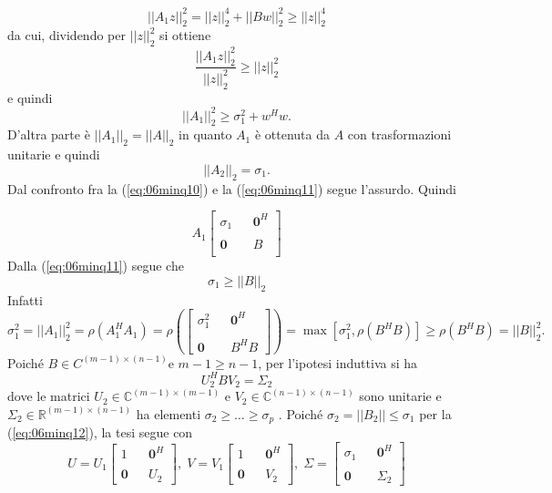 \begin{thproof}
$$
||A_1 z||_2^2 = ||z||_2^4 + || Bw||_2^{2} \geq ||z||_2^4
$$
da cui, dividendo per $||z||_2^2$ si ottiene
$$
\dfrac{||A_1z||_2^2}{||z||_2^2} \geq ||z||_2^2
$$
e quindi
\begin{equation}
  \label{eq:06minq10} ||A_1||_2^{2} \geq \sigma_1^{2} + w^{H}w.
\end{equation}
D'altra parte \`e $||A_1||_2 = ||A||_2$ 
 in quanto $A_1$ \`e ottenuta da $A$ con trasformazioni unitarie e
quindi
 \begin{equation}
   \label{eq:06minq11} ||A_2||_2 =\sigma_1.
 \end{equation} Dal confronto fra la (\ref{eq:06minq10}) e la
(\ref{eq:06minq11}) segue l’assurdo. Quindi

$$
A_1 \left[
\begin{array}{ccc} \sigma_1 & & \mathbf{0}^{H}\\ & & \\ \mathbf{0} & &
B \\
\end{array} \right]
$$
Dalla (\ref{eq:06minq11}) segue che
\begin{equation}
  \label{eq:06minq12} \sigma_1 \geq ||B||_2
\end{equation} Infatti
$$
\sigma_1^{2} = ||A_1||_2^{2} =  \rho(A_1^{H}A_1) = \rho \left( \left[
\begin{array}{ccc} \sigma_1^2 & & \mathbf{0}^{H}\\ & & \\ \mathbf{0} &
& B^{H}B
\end{array} \right] \right) = \max [\sigma_1^{2}, \rho(B^{H}B)] \geq
\rho (B^H B) = ||B||_2^2 .
$$
Poich\'e $B \in C^{(m−1)\times(n−1)} $e $m − 1 \geq n − 1$, per
l'ipotesi induttiva si ha
$$
U_2^{H}BV_2 = \Sigma_2
$$
dove le matrici $U_2 \in \mathbb{C}^{(m−1)\times(m−1)}$ e $V_2 \in
\mathbb{C}^{(n−1)\times(n−1)}$ sono unitarie e $\Sigma_2 \in
\mathbb{R}^{(m−1)\times(n−1)}$ ha elementi $\sigma_2 \geq \ldots \geq
\sigma_p$ . Poich\'e $\sigma_2 = ||B_2|| \leq \sigma_1$ per la
(\ref{eq:06minq12}), la tesi segue con
$$
U= U_1 \left[
\begin{array}{ccc} 1 & & \mathbf{0}^{H}\\ & & \\ \mathbf{0} & & U_2
\end{array} \right], \; V = V_1 \left[
\begin{array}{ccc} 1 & & \mathbf{0}^{H}\\ & & \\ \mathbf{0} & & V_2
\end{array} \right], \; \Sigma = \left[
\begin{array}{ccc} \sigma_1 & & \mathbf{0}^{H}\\ & & \\ \mathbf{0} & &
\Sigma_2
\end{array} \right]
$$


\end{thproof}
